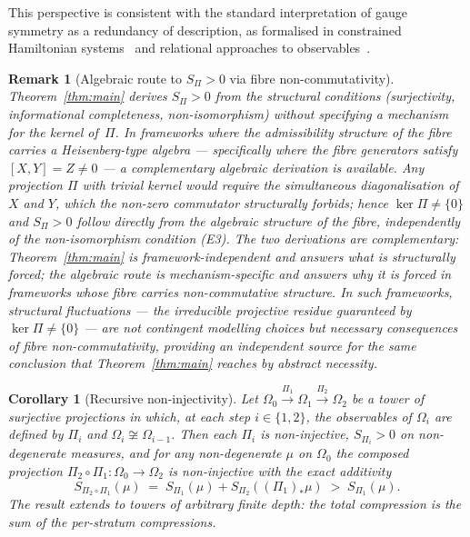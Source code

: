 \documentclass[12pt,a4paper]{article}
\newtheorem{corollary}[theorem]{Corollary}
\newtheorem{remark}{Remark}
\begin{document}
  This perspective is consistent with the standard interpretation of gauge
  symmetry as a redundancy of description, as formalised in constrained
  Hamiltonian systems~\citep{HenneauxTeitelboim1992} and relational
  approaches to observables~\citep{Rovelli2002}.

  \begin{remark}[Algebraic route to $S_\Pi > 0$ via fibre non-commutativity]
    \label{rem:heisenberg-route}
    Theorem~\ref{thm:main} derives $S_\Pi > 0$ from the structural conditions
    (surjectivity, informational completeness, non-isomorphism) without
    specifying a mechanism for the kernel of~$\Pi$.
    In frameworks where the admissibility structure of the fibre carries a
    Heisenberg-type algebra --- specifically where the fibre generators satisfy
    $[X, Y] = Z \neq 0$ --- a complementary algebraic derivation is available.
    Any projection $\Pi$ with trivial kernel would require the simultaneous
    diagonalisation of $X$ and $Y$, which the non-zero commutator structurally
    forbids; hence $\ker\Pi \neq \{0\}$ and $S_\Pi > 0$ follow directly from
    the algebraic structure of the fibre, independently of the non-isomorphism
    condition (E3).
    The two derivations are complementary: Theorem~\ref{thm:main} is
    framework-independent and answers \emph{what} is structurally forced;
    the algebraic route is mechanism-specific and answers \emph{why} it is
    forced in frameworks whose fibre carries non-commutative structure.
    In such frameworks, structural fluctuations --- the irreducible projective
    residue guaranteed by $\ker\Pi \neq \{0\}$ --- are not contingent
    modelling choices but necessary consequences of fibre non-commutativity,
    providing an independent source for the same conclusion that
    Theorem~\ref{thm:main} reaches by abstract necessity.
  \end{remark}

  \begin{corollary}[Recursive non-injectivity]
    \label{cor:recursive}
    Let $\Omega_0 \xrightarrow{\Pi_1} \Omega_1 \xrightarrow{\Pi_2} \Omega_2$ be a tower
    of surjective projections in which, at each step $i \in \{1,2\}$, the observables of
    $\Omega_i$ are defined by $\Pi_i$ and $\Omega_i \not\cong \Omega_{i-1}$.
    Then each $\Pi_i$ is non-injective, $S_{\Pi_i} > 0$ on non-degenerate measures, and for any non-degenerate
    $\mu$ on $\Omega_0$ the composed projection $\Pi_2 \circ \Pi_1 : \Omega_0 \to \Omega_2$ is non-injective
    with the exact additivity
    \[
      S_{\Pi_2 \circ \Pi_1}(\mu) \;=\; S_{\Pi_1}(\mu) + S_{\Pi_2}\!\left((\Pi_1)_*\mu\right)
      \;>\; S_{\Pi_1}(\mu).
    \]
    The result extends to towers of arbitrary finite depth: the total compression is the sum of the per-stratum
    compressions.
  \end{corollary}
\end{document}
